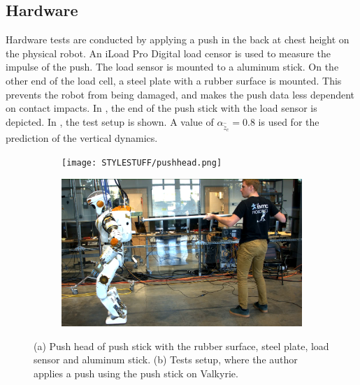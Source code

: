 \subsection{Hardware} 
Hardware tests are conducted by applying a push in the back at chest height on the physical robot. An iLoad Pro Digital load censor is used to measure the impulse of the push. The load sensor is mounted to a aluminum stick. On the other end of the load cell, a steel plate with a rubber surface is mounted. This prevents the robot from being damaged, and makes the push data less dependent on contact impacts. In , the end of the push stick with the load sensor is depicted. In , the test setup is shown. A value of $\alpha_{\hat{\ddot{z}}_{c}}=0.8$ is used for the prediction of the vertical dynamics. 
\begin{figure}
\centering
  \begin{subfigure}{0.495\textwidth}
  \centering
  \texttt{[image: STYLESTUFF/pushhead.png]}
   \caption{}
    \label{fig:pushhead}
  \end{subfigure}
  \begin{subfigure}{0.495\textwidth}
    \centering
  \includegraphics[width=.94\linewidth]{STYLESTUFF/authorpush.png}
  \caption{}
   \label{fig:authorpush}
  \end{subfigure}
  \caption{(a) Push head of push stick with the rubber surface, steel plate, load sensor and aluminum stick. (b) Tests setup, where the author applies a push using the push stick on Valkyrie.}
  \label{fig:pushsetup}
\end{figure}

